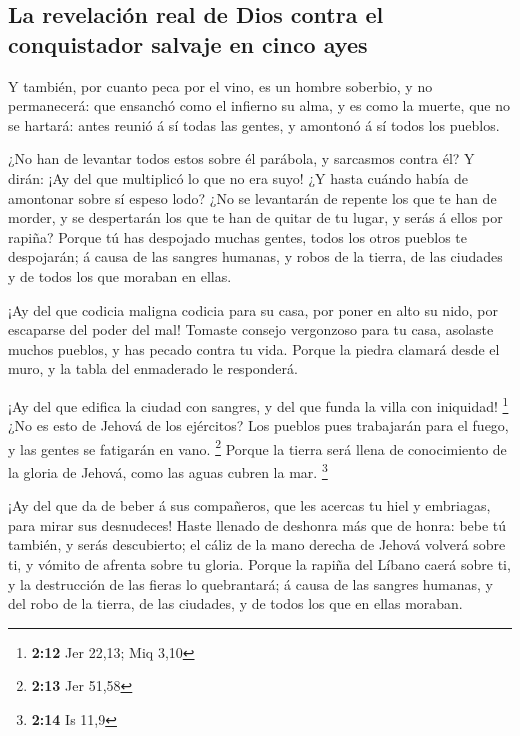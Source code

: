 \hypertarget{la-revelaciuxf3n-real-de-dios-contra-el-conquistador-salvaje-en-cinco-ayes}{%
\subsection{La revelación real de Dios contra el conquistador salvaje en
cinco
ayes}\label{la-revelaciuxf3n-real-de-dios-contra-el-conquistador-salvaje-en-cinco-ayes}}

 Y también, por cuanto peca por el vino, es un hombre
soberbio, y no permanecerá: que ensanchó como el infierno su alma, y es
como la muerte, que no se hartará: antes reunió á sí todas las gentes, y
amontonó á sí todos los pueblos.

 ¿No han de levantar todos estos sobre él parábola, y
sarcasmos contra él? Y dirán: ¡Ay del que multiplicó lo que no era suyo!
¿Y hasta cuándo había de amontonar sobre sí espeso lodo? 
¿No se levantarán de repente los que te han de morder, y se despertarán
los que te han de quitar de tu lugar, y serás á ellos por rapiña?
 Porque tú has despojado muchas gentes, todos los otros
pueblos te despojarán; á causa de las sangres humanas, y robos de la
tierra, de las ciudades y de todos los que moraban en ellas.

 ¡Ay del que codicia maligna codicia para su casa, por poner
en alto su nido, por escaparse del poder del mal!  Tomaste
consejo vergonzoso para tu casa, asolaste muchos pueblos, y has pecado
contra tu vida.  Porque la piedra clamará desde el muro, y
la tabla del enmaderado le responderá.

 ¡Ay del que edifica la ciudad con sangres, y del que funda
la villa con iniquidad! \footnote{\textbf{2:12} Jer 22,13; Miq 3,10}
 ¿No es esto de Jehová de los ejércitos? Los pueblos pues
trabajarán para el fuego, y las gentes se fatigarán en vano. \footnote{\textbf{2:13}
  Jer 51,58}  Porque la tierra será llena de conocimiento
de la gloria de Jehová, como las aguas cubren la mar. \footnote{\textbf{2:14}
  Is 11,9}

 ¡Ay del que da de beber á sus compañeros, que les acercas
tu hiel y embriagas, para mirar sus desnudeces!  Haste
llenado de deshonra más que de honra: bebe tú también, y serás
descubierto; el cáliz de la mano derecha de Jehová volverá sobre ti, y
vómito de afrenta sobre tu gloria.  Porque la rapiña del
Líbano caerá sobre ti, y la destrucción de las fieras lo quebrantará; á
causa de las sangres humanas, y del robo de la tierra, de las ciudades,
y de todos los que en ellas moraban.

